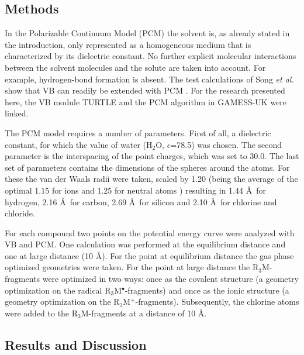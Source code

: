 \subsection{Methods}

In the Polarizable Continuum Model (PCM) the solvent is, as already stated in the introduction, only represented as a homogeneous medium that is characterized by its dielectric constant. No further explicit molecular interactions between the solvent molecules and the solute are taken into account. For example, hydrogen-bond formation is absent. The test calculations of Song \textit{et al.} show that VB can readily be extended with PCM \cite{song}. For the research presented here, the VB module TURTLE and the PCM algorithm in GAMESS-UK were linked. 

The PCM model requires a number of parameters. First of all, a dielectric constant, for which the value of water (H$_2$O, $\epsilon$=78.5) was chosen. The second parameter is the interspacing of the point charges, which was set to 30.0\degrees. The last set of parameters contains the dimensions of the spheres around the atoms. For these the van der Waals radii \cite{bondi} were taken, scaled by 1.20 (being the average of the optimal 1.15 for ions and 1.25 for neutral atoms \cite{scaling}) resulting in 1.44 \AA\  for hydrogen, 2.16 \AA\  for carbon, 2.69 \AA\ for silicon and 2.10 \AA\ for chlorine and chloride.

For each compound two points on the potential energy curve were analyzed with VB and PCM. One calculation was performed at the equilibrium distance and one at large distance (10 \AA). For the point at equilibrium distance the gas phase optimized geometries were taken. For the point at large distance the R$_3$M-fragments were optimized in two ways: once as the covalent structure (a geometry optimization on the radical R$_3$M$^\bullet$-fragments) and once as the ionic structure (a geometry optimization on the R$_3$M$^{+}$-fragments). Subsequently, the chlorine atoms were added to the R$_3$M-fragments at a distance of 10 \AA. 

\subsection{Results and Discussion}

